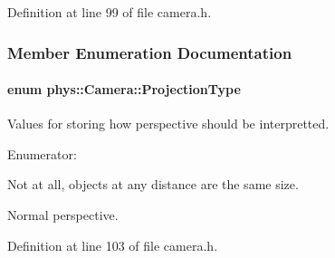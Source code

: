 Definition at line 99 of file camera.h.



\subsubsection{Member Enumeration Documentation}
\hypertarget{classphys_1_1Camera_a87d8d46e9eb2080b10712079be69d86a}{
\paragraph[{ProjectionType}]{\setlength{\rightskip}{0pt plus 5cm}enum {\bf phys::Camera::ProjectionType}}\hfill}
\label{d9/df8/classphys_1_1Camera_a87d8d46e9eb2080b10712079be69d86a}


Values for storing how perspective should be interpretted. 

\begin{Desc}
\item[Enumerator: ]\par
\begin{description}
\item[{\em 
\hypertarget{classphys_1_1Camera_a87d8d46e9eb2080b10712079be69d86aa6a71e6ab2139c8fc4d48d64aa9717f02}{
Orthographic}
\label{d9/df8/classphys_1_1Camera_a87d8d46e9eb2080b10712079be69d86aa6a71e6ab2139c8fc4d48d64aa9717f02}
}]Not at all, objects at any distance are the same size. \item[{\em 
\hypertarget{classphys_1_1Camera_a87d8d46e9eb2080b10712079be69d86aacfe21986c8c655b8d19ebd76118de055}{
Perspective}
\label{d9/df8/classphys_1_1Camera_a87d8d46e9eb2080b10712079be69d86aacfe21986c8c655b8d19ebd76118de055}
}]Normal perspective. \end{description}
\end{Desc}



Definition at line 103 of file camera.h.



